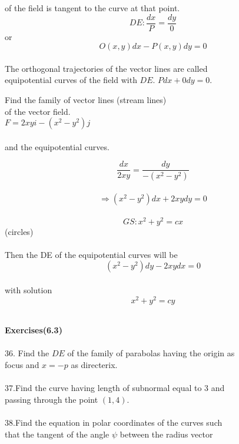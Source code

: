 \documentclass[a4paper,11pt]{amsbook}
\begin{document}


of the field is tangent to the curve at that point.\\
$$DE: \displaystyle\frac{dx}{P}=\frac{dy}{0}$$ or\\
$$\displaystyle O(x,y)dx-P(x,y)dy=0$$
\paragraph{}
The orthogonal trajectories of the vector lines are called\\
equipotential curves of the field with $DE$. $Pdx+0dy=0$.\\
\begin{exmp}
Find the family of vector lines (stream lines)\\
of the vector field.\\
$F=2xyi-(x^{2}-y^{2})j$\\
\\
and the equipotential curves.
\end{exmp}
\begin{hSolution}
$$\displaystyle\frac{dx}{2xy}=\frac{dy}{-(x^{2}-y^{2})}$$\\
$$\Longrightarrow (x^{2}-y^{2})dx+2xydy=0$$\\
$$GS: x^{2}+y^{2}=cx$$ (circles)\\
\paragraph{}
Then the DE of the equipotential curves will be\\
$$(x^{2}-y^{2})dy-2xydx=0$$\\
with solution\\
$$\displaystyle x^{2}+y^{2}=cy$$\\

\end{hSolution}
\textbf{Exercises(6.3)}\\
\\
36. Find the $DE$ of the family of parabolas having the origin as\\ 
focus and $x=-p$ as directerix.\\
\\
37.Find the curve having length of subnormal equal to 3 and\\
 passing through the point $(1,4)$.\\
\\
38.Find the equation in polar coordinates of the curves such\\
that the tangent of the angle $\psi$ between the radius vector\\
\end{document}
